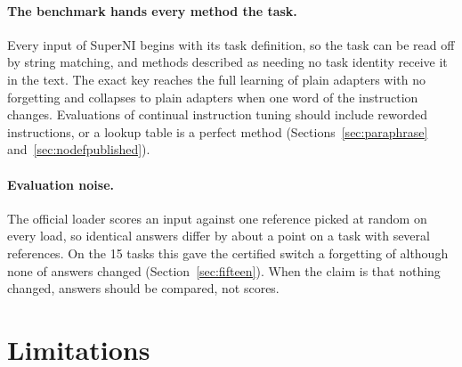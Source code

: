 \paragraph{The benchmark hands every method the task.} Every input of SuperNI begins with its task
definition, so the task can be read off by string matching, and methods described as needing no task
identity receive it in the text. The exact key reaches the full learning of plain adapters with no
forgetting and collapses to plain adapters when one word of the instruction changes. Evaluations of
continual instruction tuning should include reworded instructions, or a lookup table is a perfect
method (Sections~\ref{sec:paraphrase} and~\ref{sec:nodefpublished}).

\paragraph{Evaluation noise.} The official loader scores an input against one reference picked at
random on every load, so identical answers differ by about a point on a task with several references.
On the 15 tasks this gave the certified switch a forgetting of \FifteenCertOffFT{} although none of
\FifteenCertCompared{} answers changed (Section~\ref{sec:fifteen}). When the claim is that nothing
changed, answers should be compared, not scores.

\section{Limitations}
\label{sec:limits}

